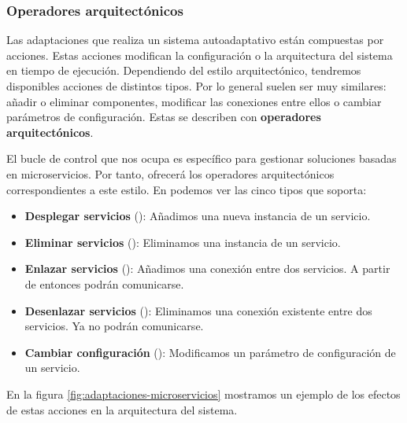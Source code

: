 \subsubsection{Operadores arquitectónicos}

Las adaptaciones que realiza un sistema autoadaptativo están compuestas por acciones. Estas acciones modifican la configuración o la arquitectura del sistema en tiempo de ejecución. Dependiendo del estilo arquitectónico, tendremos disponibles acciones de distintos tipos. Por lo general suelen ser muy similares: añadir o eliminar componentes, modificar las conexiones entre ellos o cambiar parámetros de configuración. Estas se describen con \textbf{operadores arquitectónicos}. \cite{garlanIncreasingSystemDependability2003}

El bucle de control que nos ocupa es específico para gestionar soluciones basadas en microservicios. Por tanto, ofrecerá los operadores arquitectónicos correspondientes a este estilo. En \cite{fonsEspecificacionSistemasAutoadaptativos2021} podemos ver las cinco tipos que soporta:

\begin{itemize}
  \item \textbf{Desplegar servicios} (\textbf{}): Añadimos una nueva instancia de un servicio.

  \item \textbf{Eliminar servicios} (\textbf{}): Eliminamos una instancia de un servicio.

  \item \textbf{Enlazar servicios} (\textbf{}): Añadimos una conexión entre dos servicios. A partir de entonces podrán comunicarse.

  \item \textbf{Desenlazar servicios} (\textbf{}): Eliminamos una conexión existente entre dos servicios. Ya no podrán comunicarse.

  \item \textbf{Cambiar configuración} (\textbf{}): Modificamos un parámetro de configuración de un servicio.
\end{itemize}

En la figura \ref{fig:adaptaciones-microservicios} mostramos un ejemplo de los efectos de estas acciones en la arquitectura del sistema.

